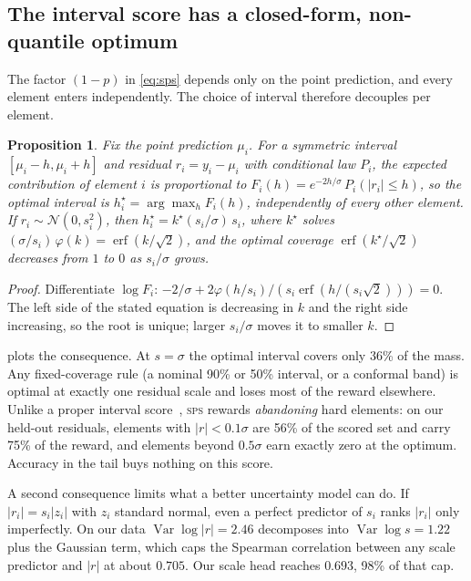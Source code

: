 \documentclass[10pt]{article}
\newtheorem{proposition}{Proposition}
\newcommand{\sps}{\textsc{sps}}
\begin{document}
\subsection{The interval score has a closed-form, non-quantile optimum}
\label{sec:sps}

The factor $(1-p)$ in \cref{eq:sps} depends only on the point prediction, and every element enters independently. The choice of interval therefore decouples per element.

\begin{proposition}
Fix the point prediction $\mu_i$. For a symmetric interval $[\mu_i-h,\mu_i+h]$ and residual $r_i=y_i-\mu_i$ with conditional law $P_i$, the expected contribution of element $i$ is proportional to $F_i(h)=e^{-2h/\sigma}\,P_i(|r_i|\le h)$, so the optimal interval is $h_i^\star=\arg\max_h F_i(h)$, independently of every other element. If $r_i\sim\mathcal{N}(0,s_i^2)$, then $h_i^\star=k^\star(s_i/\sigma)\,s_i$, where $k^\star$ solves $(\sigma/s_i)\,\varphi(k)=\operatorname{erf}(k/\sqrt2)$, and the optimal coverage $\operatorname{erf}(k^\star/\sqrt2)$ decreases from $1$ to $0$ as $s_i/\sigma$ grows.
\end{proposition}
\begin{proof}
Differentiate $\log F_i$: $-2/\sigma+2\varphi(h/s_i)/(s_i\operatorname{erf}(h/(s_i\sqrt2)))=0$. The left side of the stated equation is decreasing in $k$ and the right side increasing, so the root is unique; larger $s_i/\sigma$ moves it to smaller $k$.
\end{proof}

 plots the consequence. At $s=\sigma$ the optimal interval covers only 36\% of the mass. Any fixed-coverage rule (a nominal 90\% or 50\% interval, or a conformal band) is optimal at exactly one residual scale and loses most of the reward elsewhere. Unlike a proper interval score~\citep{gneiting2007strictly}, \sps{} rewards \emph{abandoning} hard elements: on our held-out residuals, elements with $|r|<0.1\sigma$ are 56\% of the scored set and carry 75\% of the reward, and elements beyond $0.5\sigma$ earn exactly zero at the optimum. Accuracy in the tail buys nothing on this score.

A second consequence limits what a better uncertainty model can do. If $|r_i|=s_i|z_i|$ with $z_i$ standard normal, even a perfect predictor of $s_i$ ranks $|r_i|$ only imperfectly. On our data $\operatorname{Var}\log|r|=2.46$ decomposes into $\operatorname{Var}\log s=1.22$ plus the Gaussian term, which caps the Spearman correlation between any scale predictor and $|r|$ at about $0.705$. Our scale head reaches $0.693$, 98\% of that cap.
\end{document}
